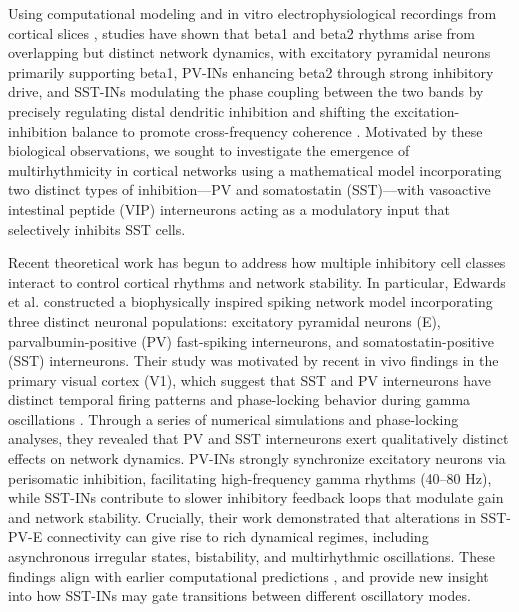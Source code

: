 \documentclass[10pt,letterpaper]{article}
\begin{document}
Using computational modeling and in vitro electrophysiological recordings from cortical slices ,\cite{pse} studies have shown that beta1 and beta2 rhythms arise from overlapping but distinct network dynamics, with excitatory pyramidal neurons primarily supporting beta1, PV-INs enhancing beta2 through strong inhibitory drive, and SST-INs modulating the phase coupling between the two bands by precisely regulating distal dendritic inhibition and shifting the excitation-inhibition balance to promote cross-frequency coherence \cite{rkc, gk,racine2021somatostatin,kopell2011neuronal,unknown2019parietal}. Motivated by these biological observations, we sought to investigate the emergence of multirhythmicity in cortical networks using a mathematical model incorporating two distinct types of inhibition—PV and somatostatin (SST)—with vasoactive intestinal peptide (VIP) interneurons acting as a modulatory input that selectively inhibits SST cells.



Recent theoretical work has begun to address how multiple inhibitory cell classes interact to control cortical rhythms and network stability. In particular, Edwards et al. \cite{edwards24} constructed a biophysically inspired spiking network model incorporating three distinct neuronal populations: excitatory pyramidal neurons (E), parvalbumin-positive (PV) fast-spiking interneurons, and somatostatin-positive (SST) interneurons. Their study was motivated by recent in vivo findings in the primary visual cortex (V1), which suggest that SST and PV interneurons have distinct temporal firing patterns and phase-locking behavior during gamma oscillations \cite{onorato2025gamma, chen2017somatostatin}.
Through a series of numerical simulations and phase-locking analyses, they revealed that PV and SST interneurons exert qualitatively distinct effects on network dynamics. PV-INs strongly synchronize excitatory neurons via perisomatic inhibition, facilitating high-frequency gamma rhythms (40–80 Hz), while SST-INs contribute to slower inhibitory feedback loops that modulate gain and network stability. Crucially, their work demonstrated that alterations in SST-PV-E connectivity can give rise to rich dynamical regimes, including asynchronous irregular states, bistability, and multirhythmic oscillations. These findings align with earlier computational predictions \cite{kopell2011neuronal, gk, rkc}, and provide new insight into how SST-INs may gate transitions between different oscillatory modes.
\end{document}
